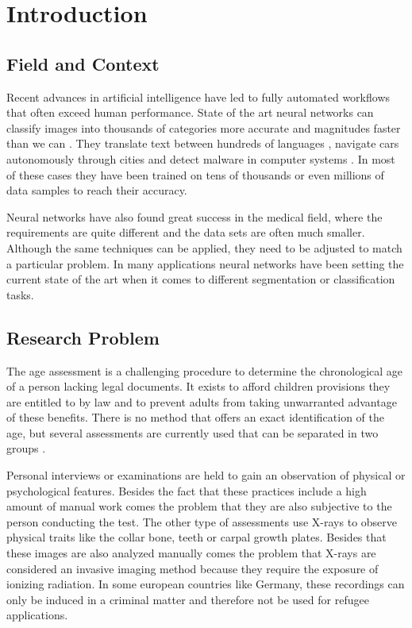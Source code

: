 \section{Introduction}

\subsection{Field and Context}

Recent advances in artificial intelligence have led to fully automated workflows that often exceed human performance. State of the art neural networks can classify images into thousands of categories more accurate and magnitudes faster than we can \cite{He2015a}. They translate text between hundreds of languages \cite{Wu2016}, navigate cars autonomously through cities \cite{Bojarski2017} and detect malware in computer systems \cite{Saxe2015}. In most of these cases they have been trained on tens of thousands or even millions of data samples to reach their accuracy. 

Neural networks have also found great success in the medical field, where the requirements are quite different and the data sets are often much smaller. Although the same techniques can be applied, they need to be adjusted to match a particular problem. In many applications neural networks have been setting the current state of the art when it comes to different segmentation or classification tasks.

\subsection{Research Problem}

The age assessment is a challenging procedure to determine the chronological age of a person lacking legal documents. It exists to afford children provisions they are entitled to by law and to prevent adults from taking unwarranted advantage of these benefits. There is no method that offers an exact identification of the age, but several assessments are currently used that can be separated in two groups \cite{EuropeanAsylumSupportOffice2013}.

Personal interviews or examinations are held to gain an observation of physical or psychological features. Besides the fact that these practices include a high amount of manual work comes the problem that they are also subjective to the person conducting the test. The other type of assessments use X-rays to observe physical traits like the collar bone, teeth or carpal growth plates. Besides that these images are also analyzed manually comes the problem that X-rays are considered an invasive imaging method because they require the exposure of ionizing radiation. In some european countries like Germany, these recordings can only be induced in a criminal matter and therefore not be used for refugee applications.

